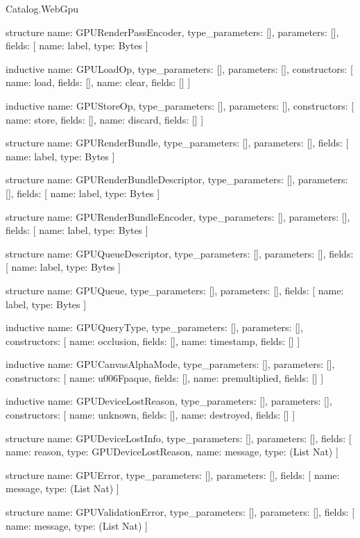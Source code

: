 \begin{lexlean}{Catalog.WebGpu}
\begin{semanticmodule}
structure{
  name: GPURenderPassEncoder,
  type_parameters: [],
  parameters: [],
  fields: [
    {name: label, type: Bytes}
  ]
}

inductive{
  name: GPULoadOp,
  type_parameters: [],
  parameters: [],
  constructors: [
    {name: load, fields: []},
    {name: clear, fields: []}
  ]
}

inductive{
  name: GPUStoreOp,
  type_parameters: [],
  parameters: [],
  constructors: [
    {name: store, fields: []},
    {name: discard, fields: []}
  ]
}

structure{
  name: GPURenderBundle,
  type_parameters: [],
  parameters: [],
  fields: [
    {name: label, type: Bytes}
  ]
}

structure{
  name: GPURenderBundleDescriptor,
  type_parameters: [],
  parameters: [],
  fields: [
    {name: label, type: Bytes}
  ]
}

structure{
  name: GPURenderBundleEncoder,
  type_parameters: [],
  parameters: [],
  fields: [
    {name: label, type: Bytes}
  ]
}

structure{
  name: GPUQueueDescriptor,
  type_parameters: [],
  parameters: [],
  fields: [
    {name: label, type: Bytes}
  ]
}

structure{
  name: GPUQueue,
  type_parameters: [],
  parameters: [],
  fields: [
    {name: label, type: Bytes}
  ]
}

inductive{
  name: GPUQueryType,
  type_parameters: [],
  parameters: [],
  constructors: [
    {name: occlusion, fields: []},
    {name: timestamp, fields: []}
  ]
}

inductive{
  name: GPUCanvasAlphaMode,
  type_parameters: [],
  parameters: [],
  constructors: [
    {name: u006Fpaque, fields: []},
    {name: premultiplied, fields: []}
  ]
}

inductive{
  name: GPUDeviceLostReason,
  type_parameters: [],
  parameters: [],
  constructors: [
    {name: unknown, fields: []},
    {name: destroyed, fields: []}
  ]
}

structure{
  name: GPUDeviceLostInfo,
  type_parameters: [],
  parameters: [],
  fields: [
    {name: reason, type: GPUDeviceLostReason},
    {name: message, type: (List Nat)}
  ]
}

structure{
  name: GPUError,
  type_parameters: [],
  parameters: [],
  fields: [
    {name: message, type: (List Nat)}
  ]
}

structure{
  name: GPUValidationError,
  type_parameters: [],
  parameters: [],
  fields: [
    {name: message, type: (List Nat)}
  ]
}


\end{semanticmodule}
\end{lexlean}
